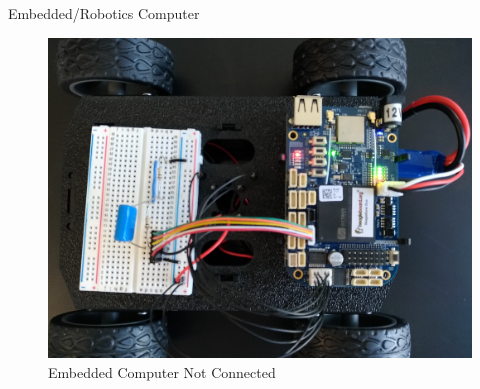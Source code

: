 \documentclass{beamer}
\begin{document}
\begin{frame}{Embedded/Robotics Computer}{} %
    \begin{multicols}{2}
        \begin{figure}
            \centering
            \includegraphics[scale=0.04]{figs/beaglebone/notConnectedSBC.jpg}
            \caption{Embedded Computer Not Connected}
            \label{fig:not_connected_bb}
        \end{figure}
        

\end{multicols}
\end{frame}
\end{document}
